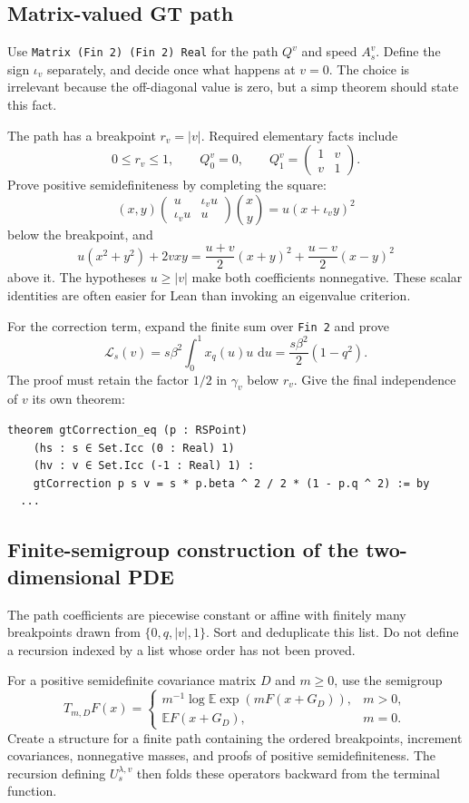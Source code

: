 \documentclass[11pt]{article}
\numberwithin{equation}{section}
\newcommand{\E}{\mathbb{E}}
\newcommand{\1}{\mathbf 1}
\newcommand{\dd}{\,\mathrm d}
\begin{document}
\subsection{Matrix-valued GT path}

Use \texttt{Matrix (Fin 2) (Fin 2) Real} for the path $Q^v$ and speed
$A_s^v$.  Define the sign $\iota_v$ separately, and decide once what happens
at $v=0$.  The choice is irrelevant because the off-diagonal value is zero,
but a simp theorem should state this fact.

The path has a breakpoint $r_v=|v|$.  Required elementary facts include
\[
0\le r_v\le1,\qquad
Q^v_0=0,\qquad
Q^v_1=\begin{pmatrix}1&v\\v&1\end{pmatrix}.
\]
Prove positive semidefiniteness by completing the square:
\[
 (x,y)
 \begin{pmatrix}u&\iota_vu\\\iota_vu&u\end{pmatrix}
 \binom{x}{y}
 =u(x+\iota_vy)^2
\]
below the breakpoint, and
\[
 u(x^2+y^2)+2vxy
 =\frac{u+v}{2}(x+y)^2+\frac{u-v}{2}(x-y)^2
\]
above it.  The hypotheses $u\ge|v|$ make both coefficients nonnegative.
These scalar identities are often easier for Lean than invoking an
eigenvalue criterion.

For the correction term, expand the finite sum over \texttt{Fin 2} and prove
\[
 \mathcal L_s(v)=s\beta^2\int_0^1x_q(u)u\,\dd u
 =\frac{s\beta^2}{2}(1-q^2).
\]
The proof must retain the factor $1/2$ in $\gamma_v$ below $r_v$.  Give the
final independence of $v$ its own theorem:
\begin{lstlisting}
theorem gtCorrection_eq (p : RSPoint)
    (hs : s ∈ Set.Icc (0 : Real) 1)
    (hv : v ∈ Set.Icc (-1 : Real) 1) :
    gtCorrection p s v = s * p.beta ^ 2 / 2 * (1 - p.q ^ 2) := by
  ...
\end{lstlisting}

\subsection{Finite-semigroup construction of the two-dimensional PDE}

The path coefficients are piecewise constant or affine with finitely many
breakpoints drawn from $\{0,q,|v|,1\}$.  Sort and deduplicate this list.
Do not define a recursion indexed by a list whose order has not been proved.

For a positive semidefinite covariance matrix $D$ and $m\ge0$, use the
semigroup
\[
 T_{m,D}F(x)=
 \begin{cases}
 m^{-1}\log\E\exp(mF(x+G_D)),&m>0,\\
 \E F(x+G_D),&m=0.
 \end{cases}
\]
Create a structure for a finite path containing the ordered breakpoints,
increment covariances, nonnegative masses, and proofs of positive
semidefiniteness.  The recursion defining $U_s^{\lambda,v}$ then folds these
operators backward from the terminal function.
\end{document}
